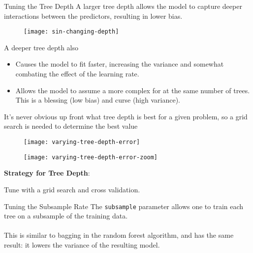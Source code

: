 %
\begin{frame}{Tuning the Tree Depth}
A larger tree depth allows the model to capture deeper interactions between the predictors, resulting in lower bias.

  \begin{figure}
    \texttt{[image: sin-changing-depth]}
  \end{figure}

\end{frame}
%
\begin{frame}
A deeper tree depth also

\begin{itemize}
  \item Causes the model to fit faster, increasing the variance and somewhat combating the effect of the learning rate.
  \item Allows the model to assume a more complex for at the same number of trees.  This is a blessing (low bias) and curse (high variance).
\end{itemize}
\end{frame}
%
\begin{frame}
It's never obvious up front what tree depth is best for a given problem, so a grid search is needed to determine the best value

  \begin{figure}
    \texttt{[image: varying-tree-depth-error]}
  \end{figure}
  
\end{frame}
%
\begin{frame}

  \begin{figure}
    \texttt{[image: varying-tree-depth-error-zoom]}
  \end{figure}
  
\end{frame}
%
\begin{frame}
\textbf{Strategy for Tree Depth}:

Tune with a grid search and cross validation.
  
\end{frame}
%
\begin{frame}{Tuning the Subsample Rate}
The \texttt{subsample} parameter allows one to train each tree on a subsample of the training data.\\~\\

This is similar to bagging in the random forest algorithm, and has the same result: it lowers the variance of the resulting model.
\end{frame}
